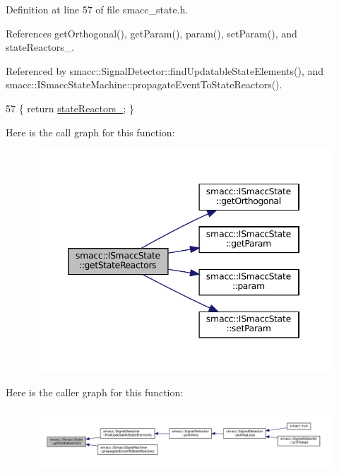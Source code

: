 Definition at line 57 of file smacc\+\_\+state.\+h.



References get\+Orthogonal(), get\+Param(), param(), set\+Param(), and state\+Reactors\+\_\+.



Referenced by smacc\+::\+Signal\+Detector\+::find\+Updatable\+State\+Elements(), and smacc\+::\+I\+Smacc\+State\+Machine\+::propagate\+Event\+To\+State\+Reactors().


\begin{DoxyCode}
57 \{ \textcolor{keywordflow}{return} \hyperlink{classsmacc_1_1ISmaccState_a7410a353b515f7b7357e94ef619a6c45}{stateReactors\_}; \}
\end{DoxyCode}
Here is the call graph for this function\+:
\nopagebreak
\begin{figure}[H]
\begin{center}
\leavevmode
\includegraphics[width=346pt]{classsmacc_1_1ISmaccState_acc40f4b3dd02a39242c7e23fe13c3e16_cgraph}
\end{center}
\end{figure}
Here is the caller graph for this function\+:
\nopagebreak
\begin{figure}[H]
\begin{center}
\leavevmode
\includegraphics[width=350pt]{classsmacc_1_1ISmaccState_acc40f4b3dd02a39242c7e23fe13c3e16_icgraph}
\end{center}
\end{figure}
\mbox{\label{classsmacc_1_1ISmaccState_a98df316afd79180d3c27a15a7d5dd1cf}} 
